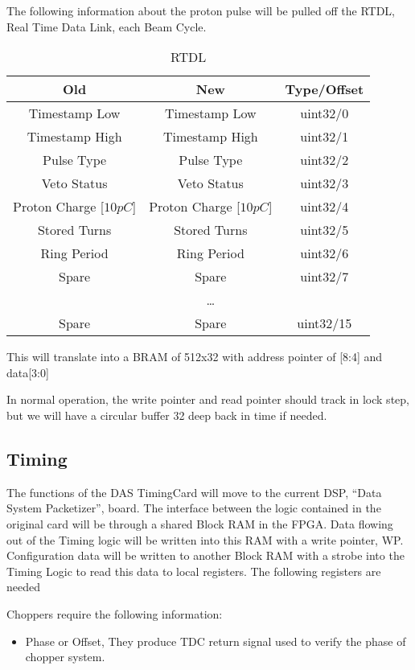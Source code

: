 The following information about the proton pulse will be pulled off the RTDL, Real Time Data Link, each Beam Cycle.

\begin{table}[h]
  \begin{center}
    \begin{tabular}{c | c | c}
    Old & New & Type/Offset \\
    \hline
    Timestamp Low & Timestamp Low & uint32/0 \\
    Timestamp High & Timestamp High & uint32/1 \\
    Pulse Type & Pulse Type & uint32/2 \\
    Veto Status & Veto Status & uint32/3 \\
    Proton Charge [$10pC$] & Proton Charge [$10pC$] & uint32/4 \\
    Stored Turns & Stored Turns & uint32/5 \\
    Ring Period & Ring Period & uint32/6 \\
    Spare & Spare & uint32/7 \\
     & \ldots & \\
    Spare & Spare & uint32/15 \\
    \end{tabular}
  \end{center}
  \caption {RTDL}
  \label{table:RTDL}
\end{table}

This will translate into a BRAM of 512x32 with address  pointer of [8:4] and data[3:0]

In normal operation, the write pointer and read pointer should track in lock step, but we will have a circular buffer 32 deep back in time if needed.

\subsection {Timing}

The functions of the DAS TimingCard will move to the current DSP, ``Data System Packetizer'', board.  The interface between the logic contained in the original card will be through a shared Block RAM in the FPGA.   Data flowing out of the Timing logic will be written into this RAM with a write pointer, WP.  Configuration data will be written to another Block RAM with a strobe into the Timing Logic to read this data to local registers.  The following registers are needed

Choppers require the following information:
\begin{itemize}
\item
Phase or Offset, They produce TDC return signal used to verify the phase of chopper system.
\end {itemize}

